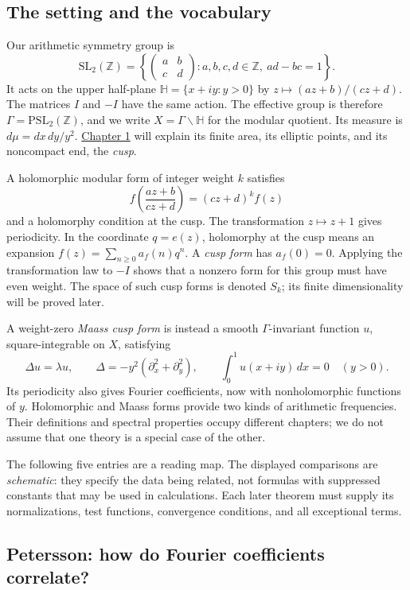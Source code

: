 \subsection{The setting and the vocabulary}\label{trace-formula-vocabulary}

Our arithmetic symmetry group is
\[
\mathrm{SL}_2(\mathbb Z)
=\left\{\begin{pmatrix}a&b\\c&d\end{pmatrix}:
a,b,c,d\in\mathbb Z,\ ad-bc=1\right\}.
\]
It acts on the upper half-plane \(\mathbb H=\{x+iy:y>0\}\) by
\(z\mapsto(az+b)/(cz+d)\). The matrices \(I\) and \(-I\) have the same action. The effective group is therefore \(\Gamma=\mathrm{PSL}_2(\mathbb Z)\), and we write \(X=\Gamma\backslash\mathbb H\) for the modular quotient. Its measure is \(d\mu=dx\,dy/y^2\). \hyperref[v1a-ch01]{Chapter 1} will explain its finite area, its elliptic points, and its noncompact end, the \emph{cusp}.

A holomorphic modular form of integer weight \(k\) satisfies
\[
f\left(\frac{az+b}{cz+d}\right)=(cz+d)^k f(z)
\]
and a holomorphy condition at the cusp. The transformation \(z\mapsto z+1\) gives periodicity. In the coordinate \(q=e(z)\), holomorphy at the cusp means an expansion \(f(z)=\sum_{n\geq0}a_f(n)q^n\). A \emph{cusp form} has \(a_f(0)=0\). Applying the transformation law to \(-I\) shows that a nonzero form for this group must have even weight. The space of such cusp forms is denoted \(S_k\); its finite dimensionality will be proved later.

A weight-zero \emph{Maass cusp form} is instead a smooth \(\Gamma\)-invariant function \(u\), square-integrable on \(X\), satisfying
\[
\Delta u=\lambda u,\qquad
\Delta=-y^2(\partial_x^2+\partial_y^2),\qquad
\int_0^1u(x+iy)\,dx=0\quad(y>0).
\]
Its periodicity also gives Fourier coefficients, now with nonholomorphic functions of \(y\). Holomorphic and Maass forms provide two kinds of arithmetic frequencies. Their definitions and spectral properties occupy different chapters; we do not assume that one theory is a special case of the other.

The following five entries are a reading map. The displayed comparisons are \emph{schematic}: they specify the data being related, not formulas with suppressed constants that may be used in calculations. Each later theorem must supply its normalizations, test functions, convergence conditions, and all exceptional terms.

\subsection{Petersson: how do Fourier coefficients correlate?}\label{petersson-preview}

